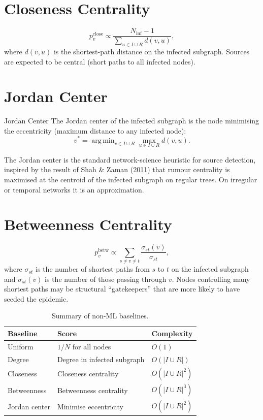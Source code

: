 \documentclass[12pt,a4paper]{report}
\DeclareMathOperator*{\argmin}{arg\,min}
\begin{document}
\section{Closeness Centrality}

\begin{equation}
  p_v^{\text{close}} \propto \frac{N_{\text{inf}} - 1}{\sum_{u \in I \cup R} d(v, u)},
\end{equation}
where $d(v, u)$ is the shortest-path distance on the infected subgraph. Sources
are expected to be central (short paths to all infected nodes).

\section{Jordan Center}

\begin{definition}{Jordan Center}
The Jordan center of the infected subgraph is the node minimising the
eccentricity (maximum distance to any infected node):
\begin{equation}
  v^* = \argmin_{v \in I \cup R} \max_{u \in I \cup R} d(v, u).
  \label{eq:jordan_center}
\end{equation}
\end{definition}

The Jordan center is the standard network-science heuristic for source
detection, inspired by the result of Shah \& Zaman (2011) that rumour centrality
is maximised at the centroid of the infected subgraph on regular trees. On
irregular or temporal networks it is an approximation.

\section{Betweenness Centrality}

\begin{equation}
  p_v^{\text{betw}} \propto \sum_{s \neq v \neq t} \frac{\sigma_{st}(v)}{\sigma_{st}},
\end{equation}
where $\sigma_{st}$ is the number of shortest paths from $s$ to $t$ on the
infected subgraph and $\sigma_{st}(v)$ is the number of those passing through
$v$. Nodes controlling many shortest paths may be structural ``gatekeepers''
that are more likely to have seeded the epidemic.

\begin{table}[H]
\centering
\caption{Summary of non-ML baselines.}
\label{tab:baselines}
\begin{tabular}{lll}
\toprule
Baseline & Score & Complexity \\
\midrule
Uniform & $1/N$ for all nodes & $O(1)$ \\
Degree & Degree in infected subgraph & $O(|I \cup R|)$ \\
Closeness & Closeness centrality & $O(|I \cup R|^2)$ \\
Betweenness & Betweenness centrality & $O(|I \cup R|^3)$ \\
Jordan center & Minimise eccentricity & $O(|I \cup R|^2)$ \\
\bottomrule
\end{tabular}
\end{table}
\end{document}
